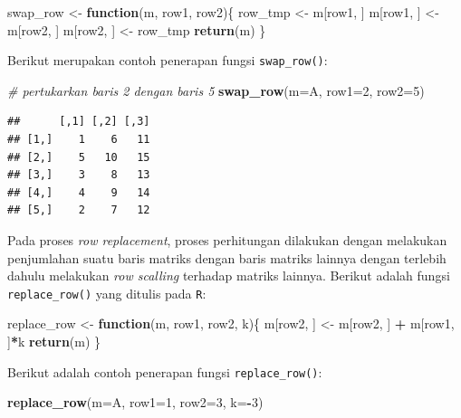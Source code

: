 \documentclass[]{book}
\newenvironment{Shaded}{\begin{snugshade}}{\end{snugshade}}
\newcommand{\CommentTok}[1]{\textcolor[rgb]{0.56,0.35,0.01}{\textit{#1}}}
\newcommand{\ControlFlowTok}[1]{\textcolor[rgb]{0.13,0.29,0.53}{\textbf{#1}}}
\newcommand{\DataTypeTok}[1]{\textcolor[rgb]{0.13,0.29,0.53}{#1}}
\newcommand{\DecValTok}[1]{\textcolor[rgb]{0.00,0.00,0.81}{#1}}
\newcommand{\KeywordTok}[1]{\textcolor[rgb]{0.13,0.29,0.53}{\textbf{#1}}}
\newcommand{\NormalTok}[1]{#1}
\newcommand{\OperatorTok}[1]{\textcolor[rgb]{0.81,0.36,0.00}{\textbf{#1}}}
\newcommand{\StringTok}[1]{\textcolor[rgb]{0.31,0.60,0.02}{#1}}
\theoremstyle{definition}
\theoremstyle{definition}
\theoremstyle{definition}
\theoremstyle{remark}
\begin{document}
\begin{Shaded}
\begin{Highlighting}[]
\NormalTok{swap_row <-}\StringTok{ }\ControlFlowTok{function}\NormalTok{(m, row1, row2)\{}
\NormalTok{  row_tmp <-}\StringTok{ }\NormalTok{m[row1, ]}
\NormalTok{  m[row1, ] <-}\StringTok{ }\NormalTok{m[row2, ]}
\NormalTok{  m[row2, ] <-}\StringTok{ }\NormalTok{row_tmp}
  \KeywordTok{return}\NormalTok{(m)}
\NormalTok{\}}
\end{Highlighting}
\end{Shaded}

Berikut merupakan contoh penerapan fungsi \texttt{swap\_row()}:

\begin{Shaded}
\begin{Highlighting}[]
\CommentTok{# pertukarkan baris 2 dengan baris 5}
\KeywordTok{swap_row}\NormalTok{(}\DataTypeTok{m=}\NormalTok{A, }\DataTypeTok{row1=}\DecValTok{2}\NormalTok{, }\DataTypeTok{row2=}\DecValTok{5}\NormalTok{)}
\end{Highlighting}
\end{Shaded}

\begin{verbatim}
##      [,1] [,2] [,3]
## [1,]    1    6   11
## [2,]    5   10   15
## [3,]    3    8   13
## [4,]    4    9   14
## [5,]    2    7   12
\end{verbatim}

Pada proses \emph{row replacement}, proses perhitungan dilakukan dengan melakukan penjumlahan suatu baris matriks dengan baris matriks lainnya dengan terlebih dahulu melakukan \emph{row scalling} terhadap matriks lainnya. Berikut adalah fungsi \texttt{replace\_row()} yang ditulis pada \texttt{R}:

\begin{Shaded}
\begin{Highlighting}[]
\NormalTok{replace_row <-}\StringTok{ }\ControlFlowTok{function}\NormalTok{(m, row1, row2, k)\{}
\NormalTok{  m[row2, ] <-}\StringTok{ }\NormalTok{m[row2, ] }\OperatorTok{+}\StringTok{ }\NormalTok{m[row1, ]}\OperatorTok{*}\NormalTok{k}
  \KeywordTok{return}\NormalTok{(m)}
\NormalTok{\}}
\end{Highlighting}
\end{Shaded}

Berikut adalah contoh penerapan fungsi \texttt{replace\_row()}:

\begin{Shaded}
\begin{Highlighting}[]
\KeywordTok{replace_row}\NormalTok{(}\DataTypeTok{m=}\NormalTok{A, }\DataTypeTok{row1=}\DecValTok{1}\NormalTok{, }\DataTypeTok{row2=}\DecValTok{3}\NormalTok{, }\DataTypeTok{k=}\OperatorTok{-}\DecValTok{3}\NormalTok{)}
\end{Highlighting}
\end{Shaded}
\end{document}
